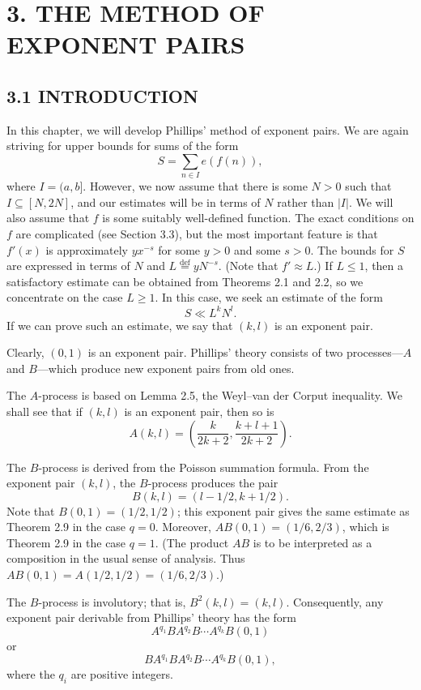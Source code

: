 \documentclass[10pt]{article}
\newcommand{\defeq}{\mathrel{\stackrel{\mathrm{def}}{=}}}
\begin{document}
\section*{3. THE METHOD OF EXPONENT PAIRS}

\subsection*{3.1 INTRODUCTION}

In this chapter, we will develop Phillips' method of exponent pairs. We are
again striving for upper bounds for sums of the form
\begin{equation*}
 S=\sum_{n\in I}e(f(n)), \tag{3.1.1}
\end{equation*}
where $I=(a,b]$. However, we now assume that there is some $N>0$ such that
$I\subseteq[N,2N]$, and our estimates will be in terms of $N$ rather than
$|I|$. We will also assume that $f$ is some suitably well-defined function.
The exact conditions on $f$ are complicated (see Section 3.3), but the most
important feature is that $f'(x)$ is approximately $yx^{-s}$ for some $y>0$
and some $s>0$. The bounds for $S$ are expressed in terms of $N$ and
$L\defeq yN^{-s}$. (Note that $f'\approx L$.) If $L\leq1$, then a satisfactory
estimate can be obtained from Theorems 2.1 and 2.2, so we concentrate on the
case $L\geq1$. In this case, we seek an estimate of the form
\[
 S\ll L^kN^l.
\]
If we can prove such an estimate, we say that $(k,l)$ is an exponent pair.

Clearly, $(0,1)$ is an exponent pair. Phillips' theory consists of two
processes---$A$ and $B$---which produce new exponent pairs from old ones.

The $A$-process is based on Lemma 2.5, the Weyl--van der Corput inequality. We
shall see that if $(k,l)$ is an exponent pair, then so is
\[
 A(k,l)=\left(\frac{k}{2k+2},\frac{k+l+1}{2k+2}\right).
\]

The $B$-process is derived from the Poisson summation formula. From the
exponent pair $(k,l)$, the $B$-process produces the pair
\[
 B(k,l)=(l-1/2,k+1/2).
\]
Note that $B(0,1)=(1/2,1/2)$; this exponent pair gives the same estimate as
Theorem 2.9 in the case $q=0$. Moreover, $AB(0,1)=(1/6,2/3)$, which is
Theorem 2.9 in the case $q=1$. (The product $AB$ is to be interpreted as a
composition in the usual sense of analysis. Thus
$AB(0,1)=A(1/2,1/2)=(1/6,2/3)$.)

The $B$-process is involutory; that is, $B^2(k,l)=(k,l)$. Consequently, any
exponent pair derivable from Phillips' theory has the form
\begin{equation*}
 A^{q_1}BA^{q_2}B\cdots A^{q_k}B(0,1) \tag{3.1.2}
\end{equation*}
or
\begin{equation*}
 BA^{q_1}BA^{q_2}B\cdots A^{q_k}B(0,1), \tag{3.1.3}
\end{equation*}
where the $q_i$ are positive integers.
\end{document}
